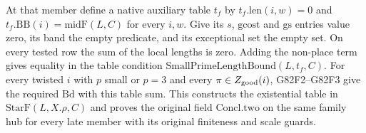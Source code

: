 At that member define a native auxiliary table $t_f$ by
$t_f.\mathrm{len}(i,w)=0$ and
$t_f.\mathrm{BB}(i)=\mathrm{midF}(L,C)$ for every $i,w$.
Give its $s$, $\mathrm{gcost}$ and $\mathrm{gs}$ entries value
zero, its band the empty predicate, and its exceptional set the
empty set. On every tested row the sum of the local lengths is
zero. Adding the non-place term gives equality in the table
condition $\mathrm{SmallPrimeLengthBound}(L,t_f,C)$. For every twisted $i$ with $p$ small or
$p=3$ and every $\pi\in Z_{\rm good}(i)$, G82F2--G82F3
give the required $\mathrm{Bd}$ with this table sum. This
constructs the existential table in $\mathrm{StarF}(L,X.\rho,C)$
and proves the original field $\mathrm{Concl.two}$ on the same
family hub for every late member with its original finiteness
and scale guards.
